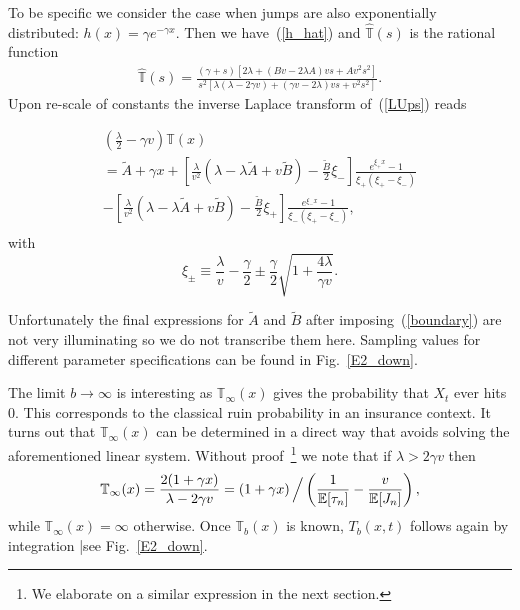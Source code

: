 \documentclass[english,aps,a4paper,twocolumn,showpacs,showkeys,amsfonts,amsmath,amssymb,amscd,nofootinbib]{revtex4}
\newcommand{\1}{\'\i}
\newcommand{\TT}{\mathbb{T}}\newcommand{\FF}{\mathbb{F}}
\begin{document}
 To be specific we consider the case when jumps are also exponentially
distributed: $h(x)=\gamma e^{-\gamma x}$. Then we have~(\ref{h_hat}) %
and  $\hat{\TT}(s)$ is the rational
function
\begin{eqnarray}
\hat{\TT}(s)= \frac{(\gamma+s)[2\lambda + (B v-2 \lambda A)v s+ A
v^2s^2]}{s^2[\lambda(\lambda-2 \gamma v)+(\gamma v-2\lambda) v s+
v^2s^2]}. \label{LUps}
\end{eqnarray}
Upon re-scale  of constants the inverse Laplace transform
of~(\ref{LUps}) reads


\begin{eqnarray}
\left(\frac{\lambda}{2}-\gamma v\right)\TT(x)\nonumber \\
=\tilde A  +  \gamma   x +
 \left[\frac{\lambda}{v^2}(\lambda-\lambda
\tilde A+   v\tilde  B) -\frac{\tilde B}{2}
\xi_{-}\right]\frac{e^{\xi_+ x}-1}{\xi_+(\xi_+-\xi_-)} \nonumber \\
- \left[\frac{\lambda}{v^2}(\lambda-\lambda\tilde  A+   v
\tilde B) -\frac{\tilde B}{2}\xi_{+}\right]\frac{e^{\xi_-
x}-1}{\xi_-(\xi_+-\xi_-)},\nonumber \\
\end{eqnarray}
with
\begin{equation}
\xi_{\pm}\equiv
\frac{\lambda}{v}-\frac{\gamma}{2}\pm\frac{\gamma}{2}\sqrt{1+\frac{4\lambda}{\gamma
v}}.\end{equation}

Unfortunately    the final  expressions for $\tilde A$ and $\tilde B$  after imposing~(\ref{boundary}) are not
  very illuminating so
 we   do not  transcribe them here. Sampling values for different
parameter specifications can be found in Fig.~\ref{E2_down}.


The limit  $b\to \infty$ is interesting as $\TT_\infty(x)$ gives
the probability that $X_t$ ever hits $0$. This corresponds to the
classical ruin probability in an insurance context.   It turns
out that $\TT_\infty(x)$ can be determined in a direct way that
avoids  solving the aforementioned linear system. Without
proof~\footnote{We elaborate on a similar expression in the next
section.} we note that if $\lambda
> 2 \gamma
 v $ then
\begin{equation}
\TT_\infty(x)=\frac{2(1+\gamma x)}{\lambda-2 \gamma v}= \left(  1+\gamma
x  \right)\Big/\left( \frac{1}{ \Bbb E[\tau_n]}- \frac{v}{  \Bbb E[J_n]}
\right),
\end{equation}
while $\TT_\infty(x)=\infty$ otherwise. Once $\TT_b(x)$ is
known, $T_b(x,t)$ follows again by integration |see Fig.~\ref{E2_down}.
\end{document}
